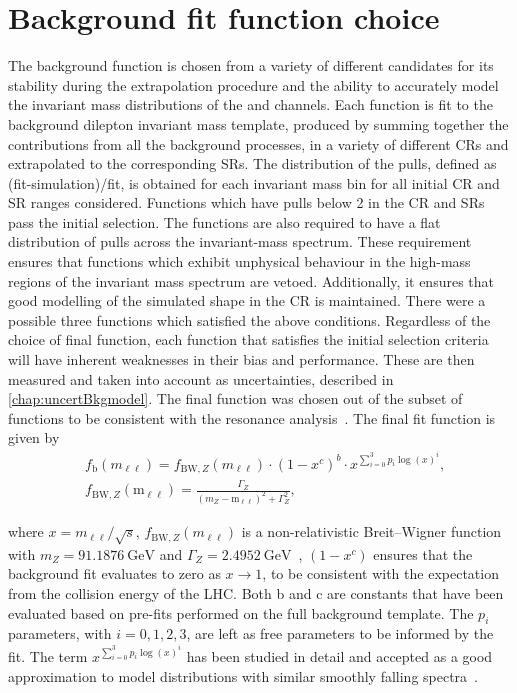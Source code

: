 \section{Background fit function choice}\label{sec:modelchoice}
The background function is chosen from a variety of different candidates for its stability during the extrapolation procedure and the ability to accurately model the invariant mass distributions of the \ee and \mumu channels. Each function is fit to the background dilepton invariant mass template, produced by summing together the contributions from all the background processes, in a variety of different CRs and extrapolated to the corresponding SRs. The distribution of the pulls, defined as (fit-simulation)/fit, is obtained for each invariant mass bin for all initial CR and SR ranges considered. Functions which have pulls below 2 in the CR and SRs pass the initial selection. The functions are also required to have a flat distribution of pulls across the invariant-mass spectrum. These requirement ensures that functions which exhibit unphysical behaviour in the high-mass regions of the invariant mass spectrum are vetoed. Additionally, it ensures that good modelling of the simulated shape in the CR is maintained. There were a possible three functions which satisfied the above conditions. Regardless of the choice of final function, each function that satisfies the initial selection criteria will have inherent weaknesses in their bias and performance. These are then measured and taken into account as uncertainties, described in \cref{chap:uncertBkgmodel}. The final function was chosen out of the subset of functions to be consistent with the resonance analysis~\cite{Aad:2019fac}. The final fit function is given by
\begin{equation}
    \label{eq:fitfunc}
    \begin{aligned}
        & f_\textrm{b}(m_{\ell\ell}) = f_{\mathrm{BW},Z}(m_{\ell\ell}) \cdot \left(1 - x^{c}\right)^{b} \cdot x^{\sum_{i=0}^3 p_i\log(x)^i}, \\
        & f_{\mathrm{BW},Z}(\mathrm{m_{\ell\ell}}) = \frac{\Gamma_Z}{(m_Z - \mathrm{m_{\ell\ell}})^2 + \Gamma_Z^2},
    \end{aligned}
\end{equation}

where $x = m_{\ell\ell}/\sqrt{s}$, $f_{\mathrm{BW},Z}(m_{\ell\ell})$ is a non-relativistic Breit--Wigner function with $m_Z = \SI{91.1876}{\giga\electronvolt}$ and $\Gamma_Z = \SI{2.4952}{\giga\electronvolt}$~\cite{PhysRevD.98.030001}, $(1 - x^{c})$ ensures that the background fit evaluates to zero as $x \to 1$, to be consistent with the expectation from the collision energy of the LHC. Both b and c are constants that have been evaluated based on pre-fits performed on the full background template. The $p_i$ parameters, with $i = 0,1,2,3$, are left as free parameters to be informed by the fit. The term $x^{\sum_{i=0}^3 p_i\log(x)^i}$ has been studied in detail and accepted as a good approximation to model distributions with similar smoothly falling spectra~\cite{Aad:2019fac,Aaboud:2016tru,Aaboud:2017yyg}.

